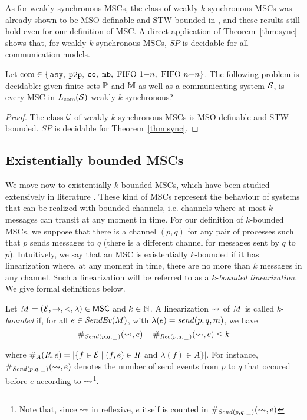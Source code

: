 As for weakly synchronous MSCs, the class of weakly $k$-synchronous MSCs was already shown to be MSO-definable and STW-bounded in \cite{BolligFG21}, and these results still hold even for our definition of MSC. A direct application of Theorem~\ref{thm:sync} shows that, for weakly $k$-synchronous MSCs, $SP$ is decidable for all communication models.

\begin{proposition}\label{thm:weak-k-sync}
	Let $\comsymb \in \{$$\asy, $ $\oneone, $ $\co, $ $\none, $ $\onen, $ $\nn\}$.
	The following problem is decidable:
	given finite sets $\Procs$ and $\Msg$ as well as a communicating system $\System$,
	is every MSC in $\cL{\System}$ weakly $k$-synchronous?
\end{proposition}
\begin{proof}
	The class $\Class$ of weakly $k$-synchronous MSCs is MSO-definable and STW-bounded. $SP$ is decidable for Theorem~\ref{thm:sync}.
\end{proof}

\subsection{Existentially bounded MSCs}

We move now to existentially $k$-bounded MSCs, which have been studied extensively in literature \cite{DBLP:conf/fossacs/LohreyM02,DBLP:conf/dlt/GenestMK04,GKM07,BolligFG21}. These  kind of MSCs represent the behaviour of systems that can be realized with bounded channels, i.e. channels where at most $k$ messages can transit at any moment in time. For our definition of $k$-bounded MSCs, we suppose that there is a channel $(p,q)$ for any pair of processes such that $p$ sends messages to $q$ (there is a different channel for messages sent by $q$ to $p$). Intuitively, we say that an MSC is existentially $k$-bounded if it has linearization where, at any moment in time, there are no more than $k$ messages in any channel. Such a linearization will be referred to as a $k$-\emph{bounded linearization}. We give formal definitions below.

\begin{definition}\label{def:lin_k_bounded}
	Let $\msc = (\Events,\procrel,\lhd,\lambda) \in \MSCs$ and $k \in \N$.
	A linearization $\linrel$ of $\msc$ is called
	$k$-\emph{bounded} if, for all $e \in \SendEv{\msc}$, with $\lambda(e) = \sact{p}{q}{\msg}$, we have
	\[
	\sametype{e}{\pqsAct{p}{q}}{\linrel} - \sametype{e}{\pqrAct{p}{q}}{\linrel} \le k
	\]
\end{definition}
\noindent where $\sametype{e}{A}{\rel} = |\{f \in \Events \mid (f,e) \in \rel$ and $\lambda(f) \in A\}|$.
For instance, $\sametype{e}{\pqsAct{p}{q}}{\linrel}$ denotes the number of send events from $p$ to $q$ that occured before $e$ according to $\linrel$\footnote{Note that, since $\linrel$ in reflexive, $e$ itself is counted in $\sametype{e}{\pqsAct{p}{q}}{\linrel}$}.

